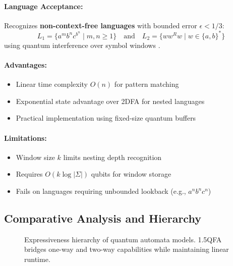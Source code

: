 \paragraph{Language Acceptance:}
Recognizes \textbf{non-context-free languages} with bounded error $\epsilon < 1/3$:
\[
L_1 = \{a^mb^nc^{b^n} \mid m,n \geq 1\} \quad \text{and} \quad L_2 = \{ww^Rw \mid w \in \{a,b\}^*\} 
\]
using quantum interference over symbol windows \cite{ambainis1998one}.

\paragraph{Advantages:}
\begin{itemize}
    \item Linear time complexity $O(n)$ for pattern matching
    \item Exponential state advantage over 2DFA for nested languages
    \item Practical implementation using fixed-size quantum buffers
\end{itemize}

\paragraph{Limitations:}
\begin{itemize}
    \item Window size $k$ limits nesting depth recognition
    \item Requires $O(k\log|\Sigma|)$ qubits for window storage
    \item Fails on languages requiring unbounded lookback (e.g., $a^nb^nc^n$)
\end{itemize}

\subsection*{Comparative Analysis and Hierarchy}
\begin{figure}[h]
\centering
{}
\caption{Expressiveness hierarchy of quantum automata models. 1.5QFA bridges one-way and two-way capabilities while maintaining linear runtime.}
\label{fig:1.5qfa-hierarchy}
\end{figure}

